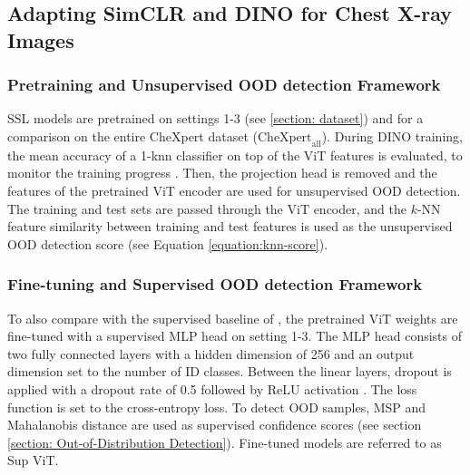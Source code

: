 \subsection{Adapting SimCLR and DINO for Chest X-ray Images}
\label{section: adapted-methods}
\subsubsection{Pretraining and Unsupervised OOD detection Framework}
SSL models are pretrained on settings 1-3 (see \ref{section: dataset}) and for a comparison on the entire CheXpert dataset ($\text{CheXpert}_\text{all}$).
During  DINO training, the mean accuracy of a 1-knn classifier on top of the ViT features is evaluated, to monitor the training progress \citep{Wu2018,Caron2021}.
Then, the projection head is removed \citep{Caron2021,Chen2020} and the features of the pretrained ViT encoder are used for unsupervised OOD detection.
The training and test sets are passed through the ViT encoder, and the $k$-NN feature similarity between training and test features is used as the unsupervised OOD detection score (see Equation \ref{equation:knn-score}).
\par
\subsubsection{Fine-tuning and Supervised OOD detection Framework}
To also compare with the supervised baseline of \citep{Berger2021}, the pretrained ViT weights are fine-tuned with a supervised MLP head on setting 1-3.
The MLP head consists of two fully connected layers with a hidden dimension of 256 and an output dimension set to the number of ID classes.
Between the linear layers, dropout is applied with a dropout rate of 0.5 \citep{Srivastava2014} followed by ReLU activation \citep{Agarap2018}.
The loss function is set to the cross-entropy loss. 
To detect OOD samples, MSP and Mahalanobis distance are used as supervised confidence scores (see section \ref{section: Out-of-Distribution Detection}).
Fine-tuned models are referred to as Sup ViT.
\par
